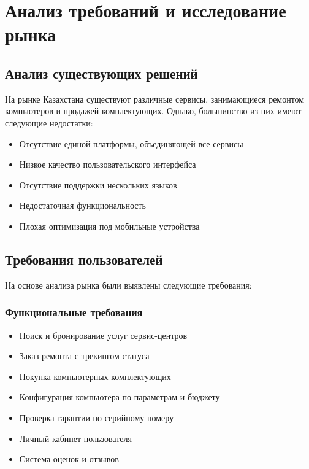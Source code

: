 \documentclass[12pt,a4paper]{report}
\begin{document}
\newpage

\chapter{Анализ требований и исследование рынка}

\section{Анализ существующих решений}
На рынке Казахстана существуют различные сервисы, занимающиеся ремонтом компьютеров и продажей комплектующих. Однако, большинство из них имеют следующие недостатки:

\begin{itemize}
    \item Отсутствие единой платформы, объединяющей все сервисы
    \item Низкое качество пользовательского интерфейса
    \item Отсутствие поддержки нескольких языков
    \item Недостаточная функциональность
    \item Плохая оптимизация под мобильные устройства
\end{itemize}

\section{Требования пользователей}
На основе анализа рынка были выявлены следующие требования:

\subsection{Функциональные требования}
\begin{itemize}
    \item Поиск и бронирование услуг сервис-центров
    \item Заказ ремонта с трекингом статуса
    \item Покупка компьютерных комплектующих
    \item Конфигурация компьютера по параметрам и бюджету
    \item Проверка гарантии по серийному номеру
    \item Личный кабинет пользователя
    \item Система оценок и отзывов
\end{itemize}
\end{document}
